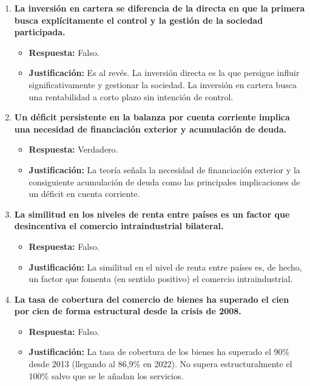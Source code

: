 \begin{enumerate}[label=\textbf{Pregunta \arabic*:}, leftmargin=*, itemsep=4ex]
\item \textbf{La inversión en cartera se diferencia de la directa en que la primera busca explícitamente el control y la gestión de la sociedad participada.}
    \begin{itemize}
        \item \textbf{Respuesta:} \textcolor{red!80!black}{Falso.}
        \item \textbf{Justificación:} Es al revés. La inversión directa es la que persigue influir significativamente y gestionar la sociedad. La inversión en cartera busca una rentabilidad a corto plazo sin intención de control.
    \end{itemize}

\item \textbf{Un déficit persistente en la balanza por cuenta corriente implica una necesidad de financiación exterior y acumulación de deuda.}
    \begin{itemize}
        \item \textbf{Respuesta:} \textcolor{blue!80!black}{Verdadero.}
        \item \textbf{Justificación:} La teoría señala la necesidad de financiación exterior y la consiguiente acumulación de deuda como las principales implicaciones de un déficit en cuenta corriente.
    \end{itemize}

\item \textbf{La similitud en los niveles de renta entre países es un factor que desincentiva el comercio intraindustrial bilateral.}
    \begin{itemize}
        \item \textbf{Respuesta:} \textcolor{red!80!black}{Falso.}
        \item \textbf{Justificación:} La similitud en el nivel de renta entre países es, de hecho, un factor que fomenta (en sentido positivo) el comercio intraindustrial.
    \end{itemize}

\item \textbf{La tasa de cobertura del comercio de bienes ha superado el cien por cien de forma estructural desde la crisis de 2008.}
    \begin{itemize}
        \item \textbf{Respuesta:} \textcolor{red!80!black}{Falso.}
        \item \textbf{Justificación:} La tasa de cobertura de los bienes ha superado el 90\% desde 2013 (llegando al 86,9\% en 2022). No supera estructuralmente el 100\% salvo que se le añadan los servicios.
    \end{itemize}


\end{enumerate}
